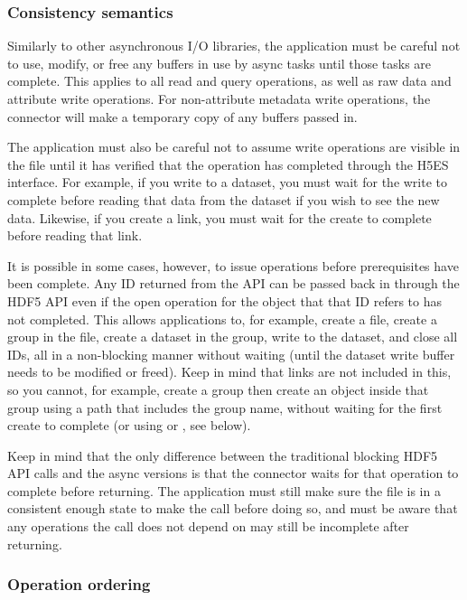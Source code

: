 \documentclass[../users_guide.tex]{subfiles}
\begin{document}
\subsubsection {Consistency semantics}

Similarly to other asynchronous I/O libraries, the application must be careful
not to use, modify, or free any buffers in use by async tasks until those tasks
are complete. This applies to all read and query operations, as well as raw data
and attribute write operations.  For non-attribute metadata write operations,
the connector will make a temporary copy of any buffers passed in.

The application must also be careful not to assume write operations are visible
in the file until it has verified that the operation has completed through the
H5ES interface. For example, if you write to a dataset, you must wait for the
write to complete before reading that data from the dataset if you wish to see
the new data. Likewise, if you create a link, you must wait for the create to
complete before reading that link.

It is possible in some cases, however, to issue operations before prerequisites
have been complete. Any ID returned from the API can be passed back in through
the HDF5 API even if the open operation for the object that that ID refers to
has not completed. This allows applications to, for example, create a file,
create a group in the file, create a dataset in the group, write to the dataset,
and close all IDs, all in a non-blocking manner without waiting (until the
dataset write buffer needs to be modified or freed). Keep in mind that links are
not included in this, so you cannot, for example, create a group then create an
object inside that group using a path that includes the group name, without
waiting for the first create to complete (or using
 or , see below).

Keep in mind that the only difference between the traditional blocking HDF5 API
calls and the async versions is that the connector waits for that operation to
complete before returning. The application must still make sure the file is in
a consistent enough state to make the call before doing so, and must be aware
that any operations the call does not depend on may still be incomplete after
returning.

\subsubsection {Operation ordering}
\end{document}
